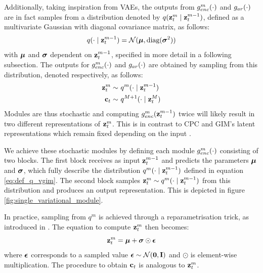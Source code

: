 			Additionally, taking inspiration from VAEs, the outputs from $g_{enc}^m(\cdot)$ and $g_{ar}(\cdot)$ are in fact samples from a distribution denoted by $q(\mathbf{z}_t^m \mid \mathbf{z}_t^{m-1})$, defined as a multivariate Gaussian with diagonal covariance matrix, as follows:
			\begin{equation}
				q(\cdot \mid \mathbf{z}_t^{m-1}) = \mathcal{N}(\bm{\mu}, \text{diag}(\bm{\sigma}^2)) \label{eq:def_q_vgim}
			\end{equation}
			with $\bm{\mu}$ and $\bm{\sigma}$ dependent on $\mathbf{z}_t^{m-1}$, specified in more detail in a following subsection.
			The outputs for $g_{enc}^m(\cdot)$ and $g_{ar}(\cdot)$ are obtained by sampling from this distribution, denoted respectively, as follows:
 			\begin{align} %
			 	\sample{\zt^m}~ & \qfromzmneg  \label{eq:sample_z_from_q} \\
			 	\sample{\ct}~ & \qfromzM
			 \end{align}
			Modules are thus stochastic and computing $g_{enc}^m(\mathbf{z}_t^{m-1})$ twice will likely result in two different representations of $\mathbf{z}_t^m$. This is in contrast to CPC and GIM's latent representations which remain fixed depending on the input \citep{oordRepresentationLearningContrastive2019, lowePuttingEndEndtoEnd2020a}.
		
			We achieve these stochastic modules by defining each module $g_{enc}^m(\cdot)$ consisting of two blocks. The first block receives as input $\mathbf{z}_t^{m-1}$ and predicts the parameters $\bm{\mu}$ and $\bm{\sigma}$, which fully describe the distribution $q^m(\cdot \mid \mathbf{z}_t^{m-1})$ defined in equation \ref{eq:def_q_vgim}. The second block samples $\mathbf{z}_t^m \sim q^m(\cdot \mid \mathbf{z}_t^{m-1})$ from this distribution and produces an output representation. This is depicted in figure \ref{fig:single_variational_module}.
			
			
			
			In practice, sampling from $q^m$ is achieved through a reparametrisation trick, as introduced in \citep{kingmaAutoEncodingVariationalBayes2022}. The equation to compute $\mathbf{z}_t^m$ then becomes:
			\begin{equation*}
				\mathbf{z}_t^m = \bm{\mu} + \bm{\sigma} \odot \bm{\epsilon}
			\end{equation*}
			where $\bm{\epsilon}$ corresponds to a sampled value $\bm{\epsilon} \sim \mathcal{N}(\bm{\mathbf{0}}, \mathbf{I})$ and $\odot$ is element-wise multiplication. The procedure to obtain $\mathbf{c}_t$ is analogous to $\mathbf{z}_t^m$.
			
